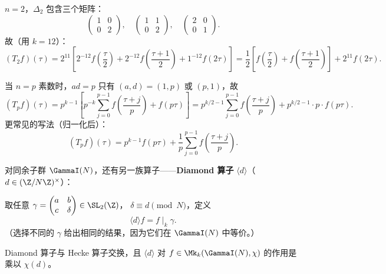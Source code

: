 \begin{example}[$T_2$ 的显式公式（$k = 12$，作用在 $\Delta$）]
\label{ex:T2-on-Delta}
$n = 2$，$\Delta_2$ 包含三个矩阵：
\[
  \begin{pmatrix}1&0\\0&2\end{pmatrix},\quad
  \begin{pmatrix}1&1\\0&2\end{pmatrix},\quad
  \begin{pmatrix}2&0\\0&1\end{pmatrix}.
\]
故（用 $k = 12$）：
\[
  (T_2 f)(\tau)
  = 2^{11}\left[
    2^{-12}f\!\left(\frac{\tau}{2}\right)
    + 2^{-12}f\!\left(\frac{\tau+1}{2}\right)
    + 1^{-12}f(2\tau)
  \right]
  = \frac{1}{2}\left[f\!\left(\frac{\tau}{2}\right)
    + f\!\left(\frac{\tau+1}{2}\right)\right] + 2^{11} f(2\tau).
\]
\end{example}

\begin{example}[$T_p$ 的简洁公式（素数 $p$）]
\label{ex:Tp-formula}
当 $n = p$ 素数时，$ad = p$ 只有 $(a,d) = (1,p)$ 或 $(p,1)$，故
\[
  (T_p f)(\tau) = p^{k-1} \left[
    p^{-k} \sum_{j=0}^{p-1} f\!\left(\frac{\tau+j}{p}\right) + f(p\tau)
  \right]
  = p^{k/2-1}\sum_{j=0}^{p-1} f\!\left(\frac{\tau+j}{p}\right)
    + p^{k/2-1} \cdot p \cdot f(p\tau).
\]
更常见的写法（归一化后）：
\[
  \boxed{(T_p f)(\tau)
  = p^{k-1} f(p\tau) + \frac{1}{p}\sum_{j=0}^{p-1} f\!\left(\frac{\tau+j}{p}\right).}
\]
\end{example}

\begin{definition}[Diamond 算子]
\label{def:diamond-operator}
对同余子群 $\GammaI(N)$，还有另一族算子——\textbf{Diamond 算子}
$\langle d \rangle$（$d \in (\Z/N\Z)^\times$）：

取任意 $\gamma = \begin{pmatrix} a & b \\ c & \delta \end{pmatrix} \in \SL_2(\Z)$，
$\delta \equiv d \pmod N$，定义
\[
  \langle d \rangle f = f \mid_k \gamma.
\]
（选择不同的 $\gamma$ 给出相同的结果，因为它们在 $\GammaI(N)$ 中等价。）

Diamond 算子与 Hecke 算子交换，且 $\langle d \rangle$ 对 $f \in \Mk_k(\GammaI(N), \chi)$
的作用是乘以 $\chi(d)$。
\end{definition}


